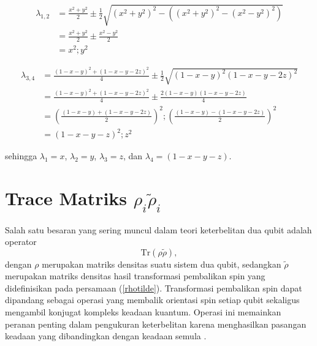 \begin{enumerate}
	\begin{equation}
		\begin{aligned}
			\lambda_{1,2}
			&=\frac{x^2+y^2}{2}\pm\frac{1}{2}\sqrt{(x^2+y^2)^2-((x^2+y^2)^2-(x^2-y^2)^2)}\\
			&=\frac{x^2+y^2}{2}\pm\frac{x^2-y^2}{2}\\
			&=x^2; y^2
		\end{aligned}
	\end{equation}
	
	\begin{equation}
		\begin{aligned}
			\lambda_{3,4}
			&=\frac{(1-x-y)^2+(1-x-y-2z)^2}{4}\pm\frac{1}{2}\sqrt{(1-x-y)^2(1-x-y-2z)^2}\\
			&=\frac{(1-x-y)^2+(1-x-y-2z)^2}{4}\pm\frac{2{(1-x-y)(1-x-y-2z)}}{4}\\
			&=(\frac{(1-x-y)+(1-x-y-2z)}{2})^2; (\frac{(1-x-y)-(1-x-y-2z)}{2})^2\\
			&=(1-x-y-z)^2; z^2
		\end{aligned}
	\end{equation}
	
	sehingga $\lambda_1=x$, $\lambda_2=y$, $\lambda_3=z$, dan $\lambda_4=(1-x-y-z)$.
\end{enumerate}

\section{Trace Matriks $\rho_i\tilde{\rho}_i$}
\par
Salah satu besaran yang sering muncul dalam teori keterbelitan dua qubit adalah operator
\begin{equation}
	\mathrm{Tr}(\rho\tilde{\rho}),
\end{equation}
dengan $\rho$ merupakan matriks densitas suatu sistem dua qubit, sedangkan $\tilde{\rho}$ merupakan matriks densitas hasil transformasi pembalikan spin yang didefinisikan pada persamaan (\ref{rhotilde}). Transformasi pembalikan spin dapat dipandang sebagai operasi yang membalik orientasi spin setiap qubit sekaligus mengambil konjugat kompleks keadaan kuantum. Operasi ini memainkan peranan penting dalam pengukuran keterbelitan karena menghasilkan pasangan keadaan yang dibandingkan dengan keadaan semula \cite{Wootters1998}.

